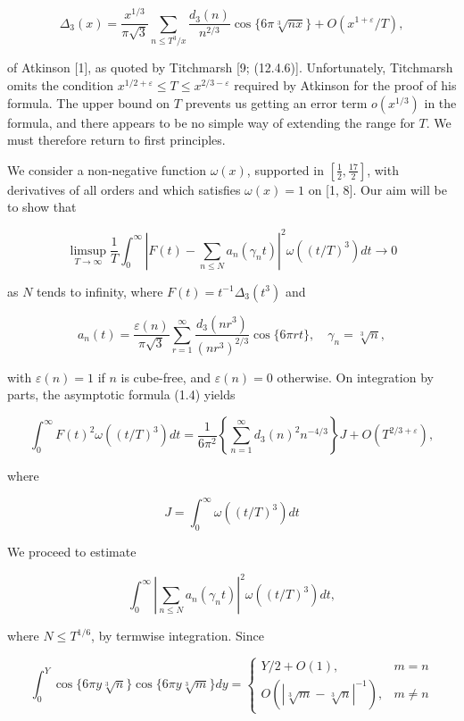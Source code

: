 \documentclass[10pt]{article}
\begin{document}
$$
\Delta_{3}(x)=\frac{x^{1 / 3}}{\pi \sqrt{3}} \sum_{n \leq T^{3} / x} \frac{d_{3}(n)}{n^{2 / 3}} \cos \{6 \pi \sqrt[3]{n x}\}+O\left(x^{1+\varepsilon} / T\right),
$$

of Atkinson [1], as quoted by Titchmarsh [9; (12.4.6)]. Unfortunately, Titchmarsh omits the condition $x^{1 / 2+\varepsilon} \leq T \leq x^{2 / 3-\varepsilon}$ required by Atkinson for the proof of his formula. The upper bound on $T$ prevents us getting an error term $o\left(x^{1 / 3}\right)$ in the formula, and there appears to be no simple way of extending the range for $T$. We must therefore return to first principles.

We consider a non-negative function $\omega(x)$, supported in $\left[\frac{1}{2}, \frac{17}{2}\right]$, with derivatives of all orders and which satisfies $\omega(x)=1$ on [1, 8]. Our aim will be to show that

$$
\limsup _{T \rightarrow \infty} \frac{1}{T} \int_{0}^{\infty}\left|F(t)-\sum_{n \leq N} a_{n}\left(\gamma_{n} t\right)\right|^{2} \omega\left((t / T)^{3}\right) d t \rightarrow 0
$$

as $N$ tends to infinity, where $F(t)=t^{-1} \Delta_{3}\left(t^{3}\right)$ and

$$
a_{n}(t)=\frac{\varepsilon(n)}{\pi \sqrt{3}} \sum_{r=1}^{\infty} \frac{d_{3}\left(n r^{3}\right)}{\left(n r^{3}\right)^{2 / 3}} \cos \{6 \pi r t\}, \quad \gamma_{n}=\sqrt[3]{n},
$$

with $\varepsilon(n)=1$ if $n$ is cube-free, and $\varepsilon(n)=0$ otherwise. On integration by parts, the asymptotic formula (1.4) yields


\begin{equation*}
\int_{0}^{\infty} F(t)^{2} \omega\left((t / T)^{3}\right) d t=\frac{1}{6 \pi^{2}}\left\{\sum_{n=1}^{\infty} d_{3}(n)^{2} n^{-4 / 3}\right\} J+O\left(T^{2 / 3+\varepsilon}\right), \tag{7.1}
\end{equation*}


where

$$
J=\int_{0}^{\infty} \omega\left((t / T)^{3}\right) d t
$$

We proceed to estimate

$$
\int_{0}^{\infty}\left|\sum_{n \leq N} a_{n}\left(\gamma_{n} t\right)\right|^{2} \omega\left((t / T)^{3}\right) d t,
$$

where $N \leq T^{1 / 6}$, by termwise integration. Since

$$
\int_{0}^{Y} \cos \{6 \pi y \sqrt[3]{n}\} \cos \{6 \pi y \sqrt[3]{m}\} d y= \begin{cases}Y / 2+O(1), & m=n \\ O\left(|\sqrt[3]{m}-\sqrt[3]{n}|^{-1}\right), & m \neq n\end{cases}
$$
\end{document}
